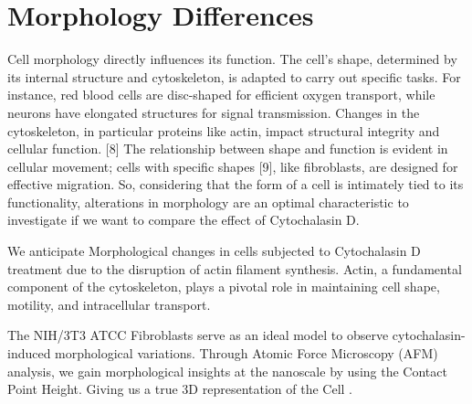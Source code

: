 \documentclass[a4paper,english,12pt,bibliography=totoc]{scrreprt}
\begin{document}

\section{Morphology Differences}
\label{sec:Morphology}

Cell morphology directly influences its function. The cell's shape, determined by its internal structure and cytoskeleton, is adapted to carry out specific tasks. For instance, red blood cells are disc-shaped for efficient oxygen transport, while neurons have elongated structures for signal transmission. Changes in the cytoskeleton, in particular proteins like actin, impact structural integrity and cellular function. [8] \newline
The relationship between shape and function is evident in cellular movement; cells with specific shapes [9], like fibroblasts, are designed for effective migration.\newline
So, considering that the form of a cell is intimately tied to its functionality, alterations in morphology are an optimal characteristic to investigate if we want to compare the effect of Cytochalasin D. 

We anticipate Morphological changes in cells subjected to Cytochalasin D treatment due to the disruption of actin filament synthesis. Actin, a fundamental component of the cytoskeleton, plays a pivotal role in maintaining cell shape, motility, and intracellular transport.\newline

The NIH/3T3 ATCC Fibroblasts serve as an ideal model to observe cytochalasin-induced morphological variations. Through Atomic Force Microscopy (AFM) analysis, we gain morphological insights at the nanoscale by using the Contact Point Height. Giving us a true 3D representation of the Cell .\newline
\end{document}
